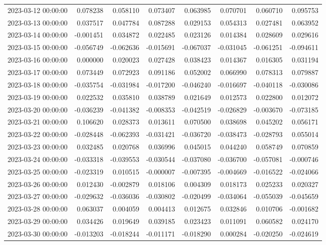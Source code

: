 \begin{tabular}{lrrrrrrr}
2023-03-12 00:00:00 & 0.078238 & 0.058110 & 0.073407 & 0.063985 & 0.070701 & 0.060710 & 0.095753 \\
2023-03-13 00:00:00 & 0.037517 & 0.047784 & 0.087288 & 0.029153 & 0.054313 & 0.027481 & 0.063952 \\
2023-03-14 00:00:00 & -0.001451 & 0.034872 & 0.022485 & 0.023126 & 0.014384 & 0.028609 & 0.029616 \\
2023-03-15 00:00:00 & -0.056749 & -0.062636 & -0.015691 & -0.067037 & -0.031045 & -0.061251 & -0.094611 \\
2023-03-16 00:00:00 & 0.000000 & 0.020023 & 0.027428 & 0.038423 & 0.014367 & 0.016305 & 0.031194 \\
2023-03-17 00:00:00 & 0.073449 & 0.072923 & 0.091186 & 0.052002 & 0.066990 & 0.078313 & 0.079887 \\
2023-03-18 00:00:00 & -0.035754 & -0.031984 & -0.017200 & -0.046240 & -0.016697 & -0.040118 & -0.030086 \\
2023-03-19 00:00:00 & 0.022532 & 0.035810 & 0.038789 & 0.021649 & 0.012573 & 0.022800 & 0.012072 \\
2023-03-20 00:00:00 & -0.036239 & -0.041382 & -0.008353 & -0.042519 & -0.026829 & -0.003670 & -0.073185 \\
2023-03-21 00:00:00 & 0.106620 & 0.028373 & 0.013611 & 0.070500 & 0.038698 & 0.045202 & 0.056171 \\
2023-03-22 00:00:00 & -0.028448 & -0.062393 & -0.031421 & -0.036720 & -0.038473 & -0.028793 & 0.055014 \\
2023-03-23 00:00:00 & 0.032485 & 0.020768 & 0.036996 & 0.045015 & 0.044240 & 0.058749 & 0.070859 \\
2023-03-24 00:00:00 & -0.033318 & -0.039553 & -0.030544 & -0.037080 & -0.036700 & -0.057081 & -0.000746 \\
2023-03-25 00:00:00 & -0.023319 & 0.010515 & -0.000007 & -0.007395 & -0.004669 & -0.016522 & -0.024066 \\
2023-03-26 00:00:00 & 0.012430 & -0.002879 & 0.018106 & 0.004309 & 0.018173 & 0.025233 & 0.020327 \\
2023-03-27 00:00:00 & -0.029632 & -0.036036 & -0.030802 & -0.020499 & -0.034064 & -0.055039 & -0.045659 \\
2023-03-28 00:00:00 & 0.063037 & 0.004059 & 0.004413 & 0.012675 & 0.032846 & 0.010706 & -0.001682 \\
2023-03-29 00:00:00 & 0.034426 & 0.019649 & 0.039185 & 0.023423 & 0.011091 & 0.060582 & 0.024170 \\
2023-03-30 00:00:00 & -0.013203 & -0.018244 & -0.011171 & -0.018290 & 0.000284 & -0.020250 & -0.024619 \\

\end{tabular}
